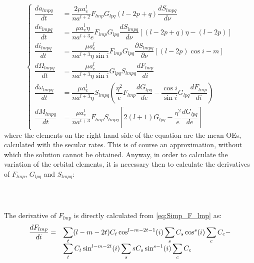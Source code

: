 				\begin{equation}
				\left\{ \begin{array}{llll}
				\dfrac{da_{lmpq}}{dt} 		& = \dfrac{2\mu a_e^l}{na^{l+2}} F_{lmp} G_{lpq} (l - 2p + q)\dfrac{ d S_{lmpq}}{d \nu} \\[1.2 em]
				\dfrac{de_{lmpq}}{dt} 		& = \dfrac{\mu a_e^l \eta}{na^{l + 3} e} F_{lmp} G_{lpq} \dfrac{ dS_{lmpq}}{d \nu} \left[ \left( l - 2p + q\right) \eta - \left(l - 2p\right)\right] \\[1.2 em]
				\dfrac{di_{lmpq}}{dt} 		& = \dfrac{\mu a_e^l}{na^{l + 3} \eta \sin i}F_{lmp} G_{lpq}  \dfrac{ \partial S_{lmpq}}{\partial \nu} \left[ \left( l - 2p \right) \cos i - m\right] \\[1.2 em]
				\dfrac{d\Omega_{lmpq}}{dt} 	& = \dfrac{\mu a_e^l}{na^{l + 3} \eta \sin i} G_{lpq} S_{lmpq}\dfrac{ dF_{lmp} }{di} \\[1.2 em]
				\dfrac{d\omega_{lmpq}}{dt} 	& = \dfrac{\mu a_e^l}{na^{l + 3} \eta } S_{lmpq} \left( \dfrac{\eta^2}{e} F_{lmp} \dfrac{d G_{lpq}}{d e} - \dfrac{\cos i}{\sin i} G_{lpq} \dfrac{dF_{lmp}}{di} \right)\\[1.2 em]
				\dfrac{dM_{lmpq}}{dt}		& = \dfrac{\mu a_e^l}{n a^{l + 3}}F_{lmp} S_{lmpq} \left[2(l+1)G_{lpq} - \dfrac{\eta^2}{e} \dfrac{dG_{lpq}}{de}\right]
				\end{array}\right.
				\label{eq:Kaula_LPE_1}
				\end{equation}
				\noindent where the elements on the right-hand side of the equation are the mean OEs, calculated with the secular rates. This is of course an approximation, without which the solution cannot be obtained. Anyway, in order to calculate the variation of the orbital elements, it is necessary then to calculate the derivatives of $F_{lmp}$, $G_{lpq}$ and $S_{lmpq}$:
					\subparagraph{  \\ }
					\indent The derivative of $F_{lmp}$ is directly calculated from \eqref{eq:Simp_F_lmp} as:
					\begin{equation}
					\begin{array}{lll}
					\dfrac{dF_{lmp}}{di} =&  \displaystyle\sum_{t} (l - m - 2t) C_t \cos^{l - m - 2t - 1}(i) \displaystyle\sum_{s} C_s \cos^s (i) \displaystyle\sum_{c}C_c - \\
					& \displaystyle\sum_{t} C_t \sin^{l - m - 2t} (i) \displaystyle\sum_{s} s C_s \sin^{s-1}(i) \displaystyle\sum_{c} C_c
					\end{array}
					\label{eq:dF_lmp}
					\end{equation}
